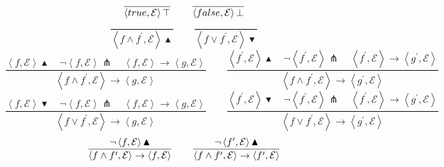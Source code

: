 \begin{equation*}
\frac{{}}{\left\langle true,\mathcal{E}\right\rangle \top }\qquad \frac{{}}{%
\left\langle false,\mathcal{E}\right\rangle \bot }
\end{equation*}%
\begin{equation*}
\frac{{}}{\left\langle f\wedge f^{\prime },\mathcal{E}\right\rangle
\blacktriangle }\qquad \frac{{}}{\left\langle f\vee f^{\prime },\mathcal{E}%
\right\rangle \blacktriangledown }
\end{equation*}%
\begin{equation*}
\frac{\left\langle f,\mathcal{E}\right\rangle \blacktriangle \quad \lnot
\left\langle f,\mathcal{E}\right\rangle \pitchfork \quad \left\langle f,%
\mathcal{E}\right\rangle \rightarrow \left\langle g,\mathcal{E}\right\rangle
}{\left\langle f\wedge f^{\prime },\mathcal{E}\right\rangle \rightarrow
\left\langle g,\mathcal{E}\right\rangle }\qquad \frac{\left\langle f^{\prime
},\mathcal{E}\right\rangle \blacktriangle \quad \lnot \left\langle f^{\prime
},\mathcal{E}\right\rangle \pitchfork \quad \left\langle f^{\prime },%
\mathcal{E}\right\rangle \rightarrow \left\langle g^{\prime },\mathcal{E}%
\right\rangle }{\left\langle f\wedge f^{\prime },\mathcal{E}\right\rangle
\rightarrow \left\langle g^{\prime },\mathcal{E}\right\rangle }
\end{equation*}%
\begin{equation*}
\frac{\left\langle f,\mathcal{E}\right\rangle \blacktriangledown \quad \lnot
\left\langle f,\mathcal{E}\right\rangle \pitchfork \quad \left\langle f,%
\mathcal{E}\right\rangle \rightarrow \left\langle g,\mathcal{E}\right\rangle
}{\left\langle f\vee f^{\prime },\mathcal{E}\right\rangle \rightarrow
\left\langle g,\mathcal{E}\right\rangle }\qquad \frac{\left\langle f^{\prime
},\mathcal{E}\right\rangle \blacktriangledown \quad \lnot \left\langle
f^{\prime },\mathcal{E}\right\rangle \pitchfork \quad \left\langle f^{\prime
},\mathcal{E}\right\rangle \rightarrow \left\langle g^{\prime },\mathcal{E}%
\right\rangle }{\left\langle f\vee f^{\prime },\mathcal{E}\right\rangle
\rightarrow \left\langle g^{\prime },\mathcal{E}\right\rangle }
\end{equation*}%
\begin{equation*}
\frac{\lnot \left\langle f,\mathcal{E}\right\rangle \blacktriangle }{%
\left\langle f\wedge f^{\prime },\mathcal{E}\right\rangle \rightarrow
\left\langle f,\mathcal{E}\right\rangle }\qquad \frac{\lnot \left\langle
f^{\prime },\mathcal{E}\right\rangle \blacktriangle }{\left\langle f\wedge
f^{\prime },\mathcal{E}\right\rangle \rightarrow \left\langle f^{\prime },%
\mathcal{E}\right\rangle }
\end{equation*}%
